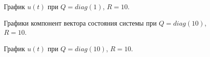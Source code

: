 \begin{figure}[!h]
	\caption{График $u(t)$ при $Q=diag(1)$, $R=10$.}
	\label{6_2_Q_1_R_10_u}
\end{figure}

\begin{figure}[!h]
	\caption{Графики компонент вектора состояния системы при $Q=diag(10)$, $R=10$.}
	\label{6_2_Q_10_R_10_x}
\end{figure}

\begin{figure}[!h]
	\caption{График $u(t)$ при $Q=diag(10)$, $R=10$.}
	\label{6_2_Q_10_R_10_u}
\end{figure}

